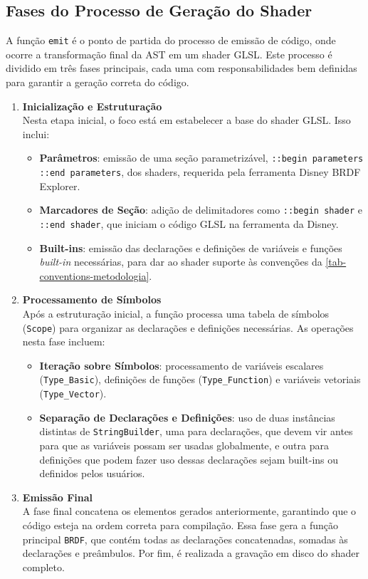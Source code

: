 \subsection{Fases do Processo de Geração do Shader}
\label{sub-start-emitting}

A função \verb"emit" é o ponto de partida do processo de emissão de código, onde ocorre a transformação final da AST em um shader GLSL. Este processo é dividido em três fases principais, cada uma com responsabilidades bem definidas para garantir a geração correta do código.

\begin{enumerate}
    \item \textbf{Inicialização e Estruturação} \\
    Nesta etapa inicial, o foco está em estabelecer a base do shader GLSL. Isso inclui:
    \begin{itemize}
        \item \textbf{Parâmetros}: emissão de uma seção parametrizável, \verb"::begin parameters ::end parameters", dos shaders, requerida pela ferramenta Disney BRDF Explorer.
        \item \textbf{Marcadores de Seção}: adição de delimitadores como \verb|::begin shader| e \verb|::end shader|, que iniciam o código GLSL na ferramenta da Disney.
        \item \textbf{Built-ins}: emissão das declarações e definições de variáveis e funções \textit{built-in} necessárias, para dar ao shader suporte às convenções da \autoref{tab-conventions-metodologia}.
    \end{itemize}

    \item \textbf{Processamento de Símbolos} \\
    Após a estruturação inicial, a função processa uma tabela de símbolos (\verb|Scope|) para organizar as declarações e definições necessárias. As operações nesta fase incluem:
    \begin{itemize}
        \item \textbf{Iteração sobre Símbolos}: processamento de variáveis escalares (\verb|Type_Basic|), definições de funções (\verb|Type_Function|) e variáveis vetoriais (\verb|Type_Vector|).
        \item \textbf{Separação de Declarações e Definições}: uso de duas instâncias distintas de \texttt{StringBuilder}, uma para declarações, que devem vir antes para que as variáveis possam ser usadas globalmente, e outra para definições que podem fazer uso dessas declarações sejam built-ins ou definidos pelos usuários.
    \end{itemize}

    \item \textbf{Emissão Final} \\
    A fase final concatena os elementos gerados anteriormente, garantindo que o código esteja na ordem correta para compilação. Essa fase gera a função principal \verb|BRDF|, que contém todas as declarações concatenadas, somadas às declarações e preâmbulos. Por fim, é realizada a gravação em disco do shader completo.
\end{enumerate}


